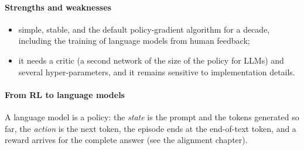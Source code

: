 \paragraph{Strengths and weaknesses}
\begin{itemize}
    \item simple, stable, and the default policy-gradient algorithm for a decade, including
        the training of language models from human feedback;
    \item it needs a critic (a second network of the size of the policy for LLMs) and
        several hyper-parameters, and it remains sensitive to implementation details.
\end{itemize}

\paragraph{From RL to language models} A language model is a policy: the \emph{state} is the
prompt and the tokens generated so far, the \emph{action} is the next token, the episode ends
at the end-of-text token, and a reward arrives for the complete answer
(see the alignment chapter).
